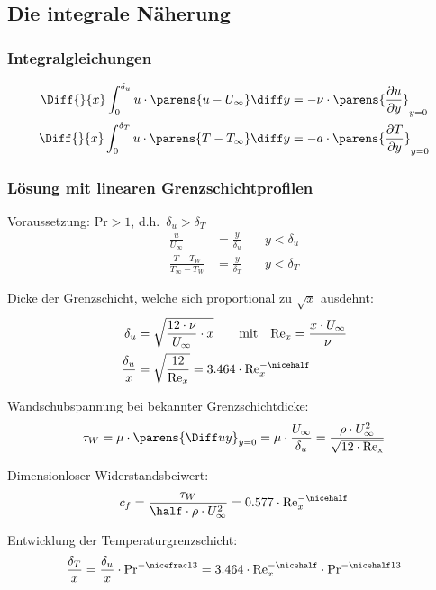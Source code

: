 	\subsection{Die integrale Näherung} %
		\subsubsection{Integralgleichungen} %
			\begin{align*}
				\Diff{}{x} \int_0^{\delta_u} u \cdot \parens{ u - U_\infty } \diff y &= - \nu \cdot \parens{ \frac{\partial u}{\partial y} }_{y=0} \\
				\Diff{}{x} \int_0^{\delta_T} u \cdot \parens{ T - T_\infty } \diff y &= - a \cdot \parens{ \frac{\partial T}{\partial y} }_{y=0}
			\end{align*}
		\subsubsection{Lösung mit linearen Grenzschichtprofilen} %
			Voraussetzung: $\mathrm{Pr} > 1$, d.h.~$\delta_u > \delta_T$
			\begin{align*}
				\frac{u}{U_\infty} &= \frac{y}{\delta_u} \quad & y<\delta_u \\
				\frac{T-T_W}{T_\infty-T_W} &= \frac{y}{\delta_T} \quad & y<\delta_T
			\end{align*}
			
			Dicke der Grenzschicht, welche sich proportional zu $\sqrt x$ ausdehnt:
			\begin{align*}
				\delta_u &= \sqrt{\frac{12 \cdot \nu}{U_\infty} \cdot x} \qquad \text{mit} \quad \mathrm{Re}_x = \frac{x \cdot U_\infty}{\nu} \\
				\frac {\delta_u} x &= \sqrt{\frac{12}{\mathrm{Re}_x}} = 3.464 \cdot \mathrm{Re}_x^{-\nicehalf}
			\end{align*}
			
			Wandschubspannung bei bekannter Grenzschichtdicke:
			\[
				\tau_W = \mu \cdot \parens{\Diff u y}_{y=0} = \mu \cdot \frac{U_\infty}{\delta_u} = \frac{\rho \cdot U_\infty^2}{\sqrt{12 \cdot \mathrm{Re_x}}}
			\]
			
			Dimensionloser Widerstandsbeiwert:
			\[
				c_f = \frac{\tau_W}{\half \cdot \rho \cdot U_\infty^2} = 0.577 \cdot \mathrm{Re}_x^{-\nicehalf}
			\]
			
			Entwicklung der Temperaturgrenzschicht:
			\[
				\frac{\delta_T}{x} = \frac{\delta_u}{x} \cdot \mathrm{Pr}^{-\nicefrac 1 3} = 3.464 \cdot \mathrm{Re}_x^{-\nicehalf} \cdot \mathrm{Pr}^{-\nicehalf 1 3}
			\]
			
